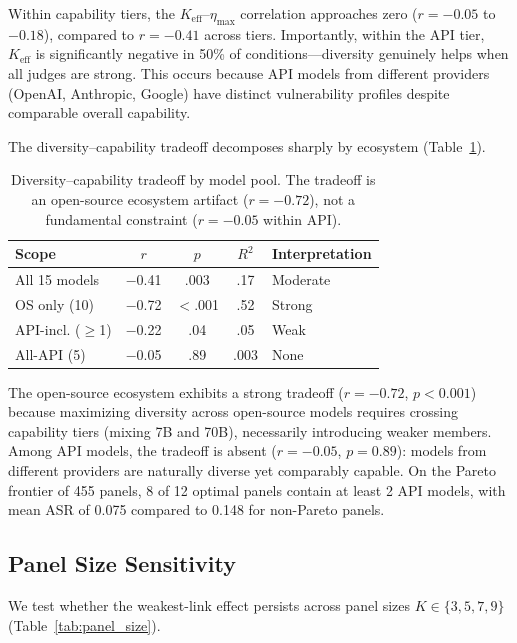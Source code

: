 \documentclass[11pt]{article}
\begin{document}
Within capability tiers, the $K_{\text{eff}}$--$\eta_{\max}$ correlation approaches zero ($r = -0.05$ to $-0.18$), compared to $r = -0.41$ across tiers.
Importantly, within the API tier, $K_{\text{eff}}$ is significantly negative in 50\% of conditions---diversity genuinely helps when all judges are strong.
This occurs because API models from different providers (OpenAI, Anthropic, Google) have distinct vulnerability profiles despite comparable overall capability.

The diversity--capability tradeoff decomposes sharply by ecosystem (Table~\ref{tab:tradeoff_decomp}).

\begin{table}[t]
\centering
\small
\begin{tabular}{lcccl}
\toprule
\textbf{Scope} & $r$ & $p$ & $R^2$ & \textbf{Interpretation} \\
\midrule
All 15 models & $-$0.41 & .003 & .17 & Moderate \\
OS only (10) & $-$0.72 & {$<$.001} & .52 & Strong \\
API-incl. ($\geq$1) & $-$0.22 & .04 & .05 & Weak \\
All-API (5) & $-$0.05 & .89 & .003 & None \\
\bottomrule
\end{tabular}
\caption{Diversity--capability tradeoff by model pool. The tradeoff is an open-source ecosystem artifact ($r = -0.72$), not a fundamental constraint ($r = -0.05$ within API).}
\label{tab:tradeoff_decomp}
\end{table}

The open-source ecosystem exhibits a strong tradeoff ($r = -0.72$, $p < 0.001$) because maximizing diversity across open-source models requires crossing capability tiers (mixing 7B and 70B), necessarily introducing weaker members.
Among API models, the tradeoff is absent ($r = -0.05$, $p = 0.89$): models from different providers are naturally diverse yet comparably capable.
On the Pareto frontier of 455 panels, 8 of 12 optimal panels contain at least 2 API models, with mean ASR of 0.075 compared to 0.148 for non-Pareto panels.

\subsection{Panel Size Sensitivity}
\label{sec:panel_size}

We test whether the weakest-link effect persists across panel sizes $K \in \{3, 5, 7, 9\}$ (Table~\ref{tab:panel_size}).
\end{document}
